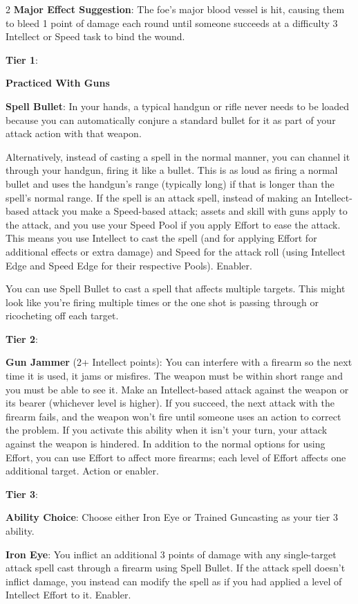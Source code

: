 \begin{multicols}{2}
\textbf{Major Effect Suggestion}: The foe’s major blood vessel is hit, causing them to bleed 1 point of damage each round until someone succeeds at a difficulty 3 Intellect or Speed task to bind the wound.

\textbf{Tier 1}:

\textbf{Practiced With Guns} 

\textbf{Spell Bullet}: In your hands, a typical handgun or rifle never needs to be loaded because you can automatically conjure a standard bullet for it as part of your attack action with that weapon.

Alternatively, instead of casting a spell in the normal manner, you can channel it through your handgun, firing it like a bullet. This is as loud as firing a normal bullet and uses the handgun’s range (typically long) if that is longer than the spell’s normal range. If the spell is an attack spell, instead of making an Intellect-based attack you make a Speed-based attack; assets and skill with guns apply to the attack, and you use your Speed Pool if you apply Effort to ease the attack. This means you use Intellect to cast the spell (and for applying Effort for additional effects or extra damage) and Speed for the attack roll (using Intellect Edge and Speed Edge for their respective Pools). Enabler.

You can use Spell Bullet to cast a spell that affects multiple targets. This might look like you’re firing multiple times or the one shot is passing through or ricocheting off each target.

\textbf{Tier 2}:

\textbf{Gun Jammer} (2+ Intellect points): You can interfere with a firearm so the next time it is used, it jams or misfires. The weapon must be within short range and you must be able to see it. Make an Intellect-based attack against the weapon or its bearer (whichever level is higher). If you succeed, the next attack with the firearm fails, and the weapon won’t fire until someone uses an action to correct the problem. If you activate this ability when it isn’t your turn, your attack against the weapon is hindered. In addition to the normal options for using Effort, you can use Effort to affect more firearms; each level of Effort affects one additional target. Action or enabler.

\textbf{Tier 3}:

\textbf{Ability Choice}: Choose either Iron Eye or Trained Guncasting as your tier 3 ability.

\textbf{Iron Eye}: You inflict an additional 3 points of damage with any single-target attack spell cast through a firearm using Spell Bullet. If the attack spell doesn’t inflict damage, you instead can modify the spell as if you had applied a level of Intellect Effort to it. Enabler.


\end{multicols}
